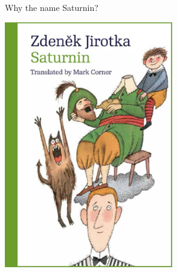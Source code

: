 \begin{frame}{Why the name Saturnin?}
\begin{center}
    \includegraphics[width=0.55\textwidth,height=0.6\textheight,keepaspectratio]{Images/Figures/novel.jpg}
    \end{center}
\end{frame}



